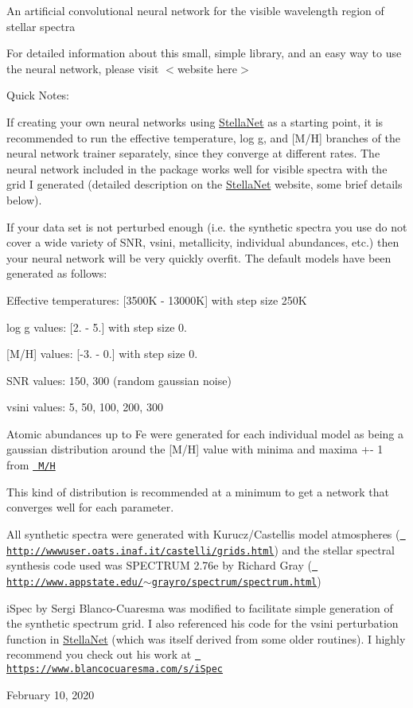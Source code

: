 An artificial convolutional neural network for the visible wavelength region of stellar spectra

For detailed information about this small, simple library, and an easy way to use the neural network, please visit $<$website here$>$

Quick Notes\+:


\begin{DoxyItemize}
\item If creating your own neural networks using \mbox{\hyperlink{namespace_stella_net}{Stella\+Net}} as a starting point, it is recommended to run the effective temperature, log g, and \mbox{[}M/H\mbox{]} branches of the neural network trainer separately, since they converge at different rates. The neural network included in the package works well for visible spectra with the grid I generated (detailed description on the \mbox{\hyperlink{namespace_stella_net}{Stella\+Net}} website, some brief details below).
\item If your data set is not perturbed enough (i.\+e. the synthetic spectra you use do not cover a wide variety of S\+NR, vsini, metallicity, individual abundances, etc.) then your neural network will be very quickly overfit. The default models have been generated as follows\+:
\item Effective temperatures\+: \mbox{[}3500K -\/ 13000K\mbox{]} with step size 250K
\item log g values\+: \mbox{[}2. -\/ 5.\mbox{]} with step size 0.
\item \mbox{[}M/H\mbox{]} values\+: \mbox{[}-\/3. -\/ 0.\mbox{]} with step size 0.
\item S\+NR values\+: 150, 300 (random gaussian noise)
\item vsini values\+: 5, 50, 100, 200, 300
\item Atomic abundances up to Fe were generated for each individual model as being a gaussian distribution around the \mbox{[}M/H\mbox{]} value with minima and maxima +-\/ 1 from \href{to prevent overfitting of [M/H]}{\texttt{ M/H}}
\end{DoxyItemize}

This kind of distribution is recommended at a minimum to get a network that converges well for each parameter.

All synthetic spectra were generated with Kurucz/\+Castelli\textquotesingle{}s model atmospheres (\href{http://wwwuser.oats.inaf.it/castelli/grids.html}{\texttt{ http\+://wwwuser.\+oats.\+inaf.\+it/castelli/grids.\+html}}) and the stellar spectral synthesis code used was S\+P\+E\+C\+T\+R\+UM 2.\+76e by Richard Gray (\href{http://www.appstate.edu/~grayro/spectrum/spectrum.html}{\texttt{ http\+://www.\+appstate.\+edu/$\sim$grayro/spectrum/spectrum.\+html}})

i\+Spec by Sergi Blanco-\/\+Cuaresma was modified to facilitate simple generation of the synthetic spectrum grid. I also referenced his code for the vsini perturbation function in \mbox{\hyperlink{namespace_stella_net}{Stella\+Net}} (which was itself derived from some older routines). I highly recommend you check out his work at \href{https://www.blancocuaresma.com/s/iSpec}{\texttt{ https\+://www.\+blancocuaresma.\+com/s/i\+Spec}}

February 10, 2020 